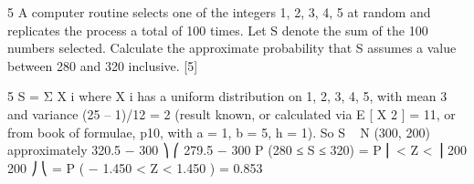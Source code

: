 \documentclass[a4paper,12pt]{article}
\begin{document}
5
A computer routine selects one of the integers 1, 2, 3, 4, 5 at random and replicates
the process a total of 100 times. Let S denote the sum of the 100 numbers selected.
Calculate the approximate probability that S assumes a value between 280 and 320
inclusive.
[5]

5
S = Σ X i where X i has a uniform distribution on 1, 2, 3, 4, 5, with mean 3 and variance
(25 – 1)/12 = 2 (result known, or calculated via E [ X 2 ] = 11, or from book of formulae,
p10, with a = 1, b = 5, h = 1).
So S ~ N (300, 200) approximately
320.5 − 300 ⎞
⎛ 279.5 − 300
P (280 ≤ S ≤ 320) = P ⎜
< Z <
⎟
200
200 ⎠
⎝
= P ( − 1.450 < Z < 1.450 ) = 0.853
\end{document}
